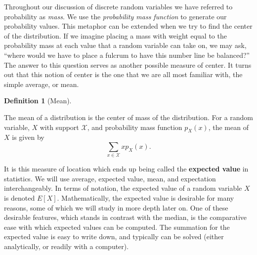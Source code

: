 \documentclass[
  letterpaper,
  DIV=11,
  numbers=noendperiod]{scrreprt}
\theoremstyle{definition}
\newtheorem{definition}{Definition}[chapter]
\theoremstyle{definition}
\theoremstyle{definition}
\theoremstyle{remark}
\begin{document}
Throughout our discussion of discrete random variables we have referred
to probability as \emph{mass}. We use the \emph{probability mass
function} to generate our probability values. This metaphor can be
extended when we try to find the center of the distribution. If we
imagine placing a mass with weight equal to the probability mass at each
value that a random variable can take on, we may ask, ``where would we
have to place a fulcrum to have this number line be balanced?'' The
answer to this question serves as another possible measure of center. It
turns out that this notion of center is the one that we are all most
familiar with, the simple average, or mean.

\begin{definition}[Mean]\protect\hypertarget{def-mean}{}\label{def-mean}

The mean of a distribution is the center of mass of the distribution.
For a random variable, \(X\) with support \(\mathcal{X}\), and
probability mass function \(p_X(x)\), the mean of \(X\) is given by
\[\sum_{x \in \mathcal{X}} xp_X(x).\]

\end{definition}

It is this measure of location which ends up being called the
\textbf{expected value} in statistics. We will use average, expected
value, mean, and expectation interchangeably. In terms of notation, the
expected value of a random variable \(X\) is denoted \(E[X]\).
Mathematically, the expected value is desirable for many reasons, some
of which we will study in more depth later on. One of these desirable
features, which stands in contrast with the median, is the comparative
ease with which expected values can be computed. The summation for the
expected value is easy to write down, and typically can be solved
(either analytically, or readily with a computer).
\end{document}

